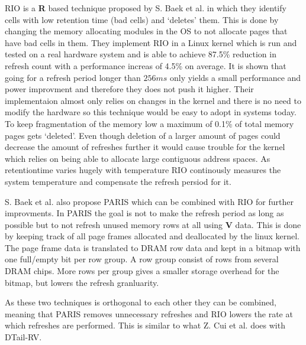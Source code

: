 RIO is a \textbf{R} based technique proposed by S. Baek et al. \cite{rioparis} in which they identify cells with low retention time (bad cells) and `deletes' them. This is done by changing the memory allocating modules in the OS to not allocate pages that have bad cells in them. They implement RIO in a Linux kernel which is run and tested on a real hardware system and is able to achieve 87.5\% reduction in refresh count with a performance increas of 4.5\% on average. It is shown that going for a refresh period longer than \(256ms\) only yields a small performance and power improvment and therefore they does not push it higher. Their implementaion almost only relies on changes in the kernel and there is no need to modify the hardware so this technique would be easy to adopt in systems today. To keep fragmentation of the memory low a maximum of 0.1\% of total memory pages gets `deleted'. Even though deletion of a larger amount of pages could decrease the amount of refreshes further it would cause trouble for the kernel which relies on being able to allocate large contiguous address spaces. As retentiontime varies hugely with temperature RIO continously measures the system temperature and compensate the refresh persiod for it. 

S. Baek et al. also propose PARIS which can be combined with RIO for further improvments. In PARIS the goal is not to make the refresh period as long as possible but to not refresh unused memory rows at all using \textbf{V} data. This is done by keeping track of all page frames allocated and deallocated by the linux kernel. The page frame data is translated to DRAM row data and kept in a bitmap with one full/empty bit per row group. A row group consist of rows from several DRAM chips. More rows per group gives a smaller storage overhead for the bitmap, but lowers the refresh granluarity. 

As these two techniques is orthogonal to each other they can be combined, meaning that PARIS removes unnecessary refreshes and RIO lowers the rate at which refreshes are performed. This is similar to what Z. Cui et al. does with DTail-RV. 